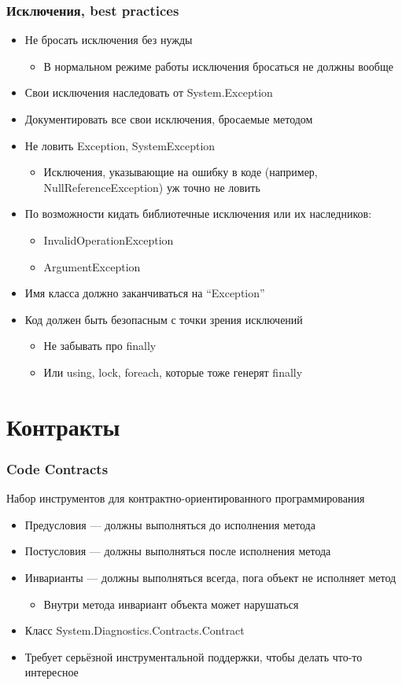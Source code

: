 \documentclass[xetex,mathserif,serif]{beamer}
\begin{document}
	\begin{frame}
		\frametitle{Исключения, best practices}
		\begin{itemize}
			\item Не бросать исключения без нужды
			\begin{itemize}
				\item В нормальном режиме работы исключения бросаться не должны вообще
			\end{itemize}
			\item Свои исключения наследовать от System.Exception
			\item Документировать все свои исключения, бросаемые методом
			\item Не ловить Exception, SystemException
			\begin{itemize}
				\item Исключения, указывающие на ошибку в коде (например, NullReferenceException) уж точно не ловить
			\end{itemize}
			\item По возможности кидать библиотечные исключения или их наследников:
			\begin{itemize}
				\item InvalidOperationException
				\item ArgumentException
			\end{itemize}
			\item Имя класса должно заканчиваться на ``Exception''
			\item Код должен быть безопасным с точки зрения исключений
			\begin{itemize}
				\item Не забывать про finally 
				\item Или using, lock, foreach, которые тоже генерят finally
			\end{itemize}
		\end{itemize}
	\end{frame}

	\section{Контракты}

	\begin{frame}
		\frametitle{Code Contracts}
		Набор инструментов для контрактно-ориентированного программирования
		\begin{itemize}
			\item Предусловия --- должны выполняться до исполнения метода
			\item Постусловия --- должны выполняться после исполнения метода
			\item Инварианты --- должны выполняться всегда, пога объект не исполняет метод
			\begin{itemize}
				\item Внутри метода инвариант объекта может нарушаться
			\end{itemize}
			\item Класс System.Diagnostics.Contracts.Contract
			\item Требует серьёзной инструментальной поддержки, чтобы делать что-то интересное
		\end{itemize}
	\end{frame}
\end{document}
